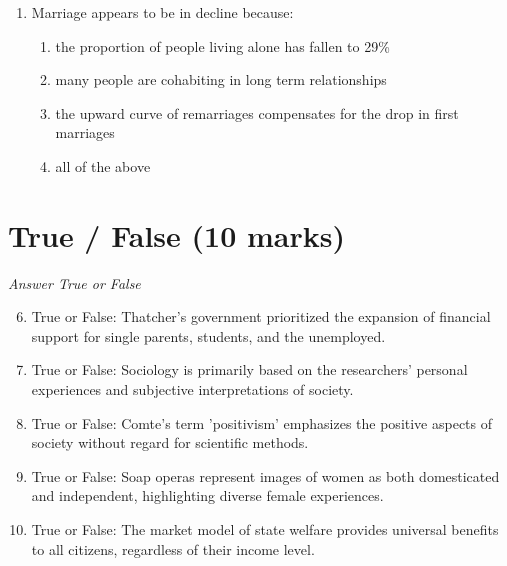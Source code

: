 \documentclass[12pt]{article}
\begin{document}
\begin{enumerate}[label=\arabic*.]
\begin{enumerate}[label=(\alph*)]
    \item Prime Minister, Archbishop of York, Viscounts of England
    \item Marquesses of England, Earls of Great Britain, King's Brothers
    \item Esquires, Serjeants of Law, Dukes' Eldest Sons
    \item King's Grandsons, Lord High Treasurer, Companions of the Bath
\end{enumerate}
\item Marriage appears to be in decline because:
\begin{enumerate}[label=(\alph*)]
    \item the proportion of people living alone has fallen to 29\%
    \item many people are cohabiting in long term relationships
    \item the upward curve of remarriages compensates for the drop in first marriages
    \item all of the above
\end{enumerate}
\end{enumerate}

\section*{True / False (10 marks)}
\textit{Answer True or False}
\begin{enumerate}[label=\arabic*.]
\setcounter{enumi}{5}
\item True or False: Thatcher's government prioritized the expansion of financial support for single parents, students, and the unemployed.
\item True or False: Sociology is primarily based on the researchers' personal experiences and subjective interpretations of society.
\item True or False: Comte's term 'positivism' emphasizes the positive aspects of society without regard for scientific methods.
\item True or False: Soap operas represent images of women as both domesticated and independent, highlighting diverse female experiences.
\item True or False: The market model of state welfare provides universal benefits to all citizens, regardless of their income level.
\end{enumerate}
\end{document}
